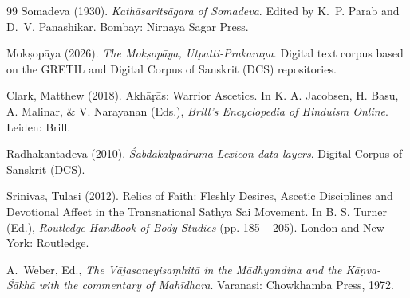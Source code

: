 \documentclass[11pt,twoside,letterpaper]{article}
\begin{document}
\begin{thebibliography}{99}
Somadeva (1930).
\newblock \emph{Kathāsaritsāgara of Somadeva}.
\newblock Edited by K.~P. Parab and D.~V. Panashikar. Bombay: Nirnaya Sagar Press.

Mokṣopāya (2026).
\newblock \emph{The Mokṣopāya, Utpatti-Prakaraṇa}.
\newblock Digital text corpus based on the GRETIL and Digital Corpus of Sanskrit (DCS) repositories.

Clark, Matthew (2018). Akhāṛās: Warrior Ascetics. In K. A. Jacobsen, H. Basu, A. Malinar, \& V. Narayanan (Eds.), \textit{Brill’s Encyclopedia of Hinduism Online}. Leiden: Brill.

Rādhākāntadeva (2010). \textit{Śabdakalpadruma Lexicon data layers}. Digital Corpus of Sanskrit (DCS).

Srinivas, Tulasi (2012). Relics of Faith: Fleshly Desires, Ascetic Disciplines and Devotional Affect in the Transnational Sathya Sai Movement. In B. S. Turner (Ed.), \textit{Routledge Handbook of Body Studies} (pp. 185 -- 205). London and New York: Routledge.

A.~Weber, Ed., \textit{The Vājasaneyisaṃhitā in the Mādhyandina and the Kāṇva-Śākhā with the commentary of Mahīdhara}. Varanasi: Chowkhamba Press, 1972.


\end{thebibliography}
\end{document}
